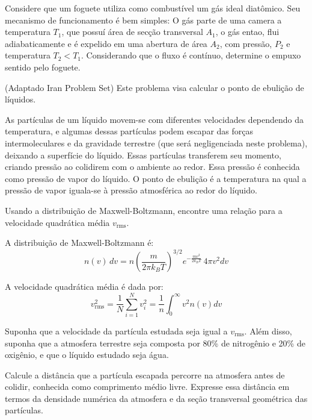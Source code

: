 \documentclass[11pt]{article}
\begin{document}
\begin{pproblem}
    Considere que um foguete utiliza como combustível um gás ideal diatômico. Seu mecanismo de funcionamento é bem simples: O gás parte de uma camera a temperatura \(T_1\), que possuí área de secção transversal \(A_1\), o gás entao, flui adiabaticamente e é expelido em uma abertura de área \(A_2\), com pressão, \(P_2\) e temperatura \(T_2<T_1\). Considerando que o fluxo é contínuo, determine o empuxo sentido pelo foguete.


\end{pproblem}


\begin{pproblem} (Adaptado Iran Problem Set)
    Este problema visa calcular o ponto de ebulição de líquidos. 

As partículas de um líquido movem-se com diferentes velocidades dependendo da temperatura, e algumas dessas partículas podem escapar das forças intermoleculares e da gravidade terrestre (que será negligenciada neste problema), deixando a superfície do líquido. Essas partículas transferem seu momento, criando pressão ao colidirem com o ambiente ao redor. Essa pressão é conhecida como pressão de vapor do líquido. O ponto de ebulição é a temperatura na qual a pressão de vapor iguala-se à pressão atmosférica ao redor do líquido.

\begin{alternativas}
\item Usando a distribuição de Maxwell-Boltzmann, encontre uma relação para a velocidade quadrática média $v_{\text{rms}}$.

A distribuição de Maxwell-Boltzmann é:
\begin{equation}
    n(v) \, dv = n \left(\frac{m}{2\pi k_B T}\right)^{3/2} e^{-\frac{mv^2}{2k_BT}} \, 4\pi v^2 dv
\end{equation}

A velocidade quadrática média é dada por:
\begin{equation}
    v_{\text{rms}}^2 = \frac{1}{N} \sum_{i=1}^N v_i^2 = \frac{1}{n} \int_0^\infty v^2 n(v) dv
\end{equation}

\item Suponha que a velocidade da partícula estudada seja igual a $v_{\text{rms}}$. Além disso, suponha que a atmosfera terrestre seja composta por 80\% de nitrogênio e 20\% de oxigênio, e que o líquido estudado seja água.

Calcule a distância que a partícula escapada percorre na atmosfera antes de colidir, conhecida como comprimento médio livre. Expresse essa distância em termos da densidade numérica da atmosfera e da seção transversal geométrica das partículas.


\end{alternativas}
\end{pproblem}
\end{document}
